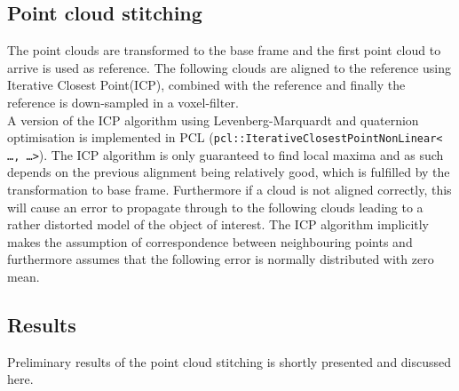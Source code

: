 \subsection{Point cloud stitching}

The point clouds are transformed to the base frame and the first point cloud to arrive is used as reference. The following clouds are aligned to the reference using Iterative Closest Point(ICP), combined with the reference and finally the reference is down-sampled in a voxel-filter.\\ 

A version of the ICP algorithm using Levenberg-Marquardt and quaternion optimisation\cite{Rusinkiewicz} is implemented in PCL (\texttt{pcl::IterativeClosestPointNonLinear< \ldots , \ldots >}). The ICP algorithm is only guaranteed to find local maxima and as such depends on the previous alignment being relatively good, which is fulfilled by the transformation to base frame. Furthermore if a cloud is not aligned correctly, this will cause an error to propagate through to the following clouds leading to a rather distorted model of the object of interest\cite{choe2007registration}. The ICP algorithm implicitly makes the assumption of correspondence between neighbouring points and furthermore assumes that the following error is normally distributed with zero mean.

\subsection{Results}
Preliminary results of the point cloud stitching is shortly presented and discussed here. 

